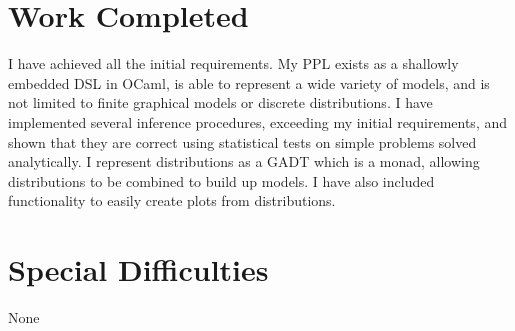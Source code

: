 \section*{Work Completed}
I have achieved all the initial requirements. My PPL exists as a shallowly embedded DSL in OCaml, is able to represent a wide variety of models, and is not limited to finite graphical models or discrete distributions. I have implemented several inference procedures, exceeding my initial requirements, and shown that they are correct using statistical tests on simple problems solved analytically. I represent distributions as a GADT which is a monad, allowing distributions to be combined to build up models. I have also included functionality to easily create plots from distributions.

\section*{Special Difficulties}
None
